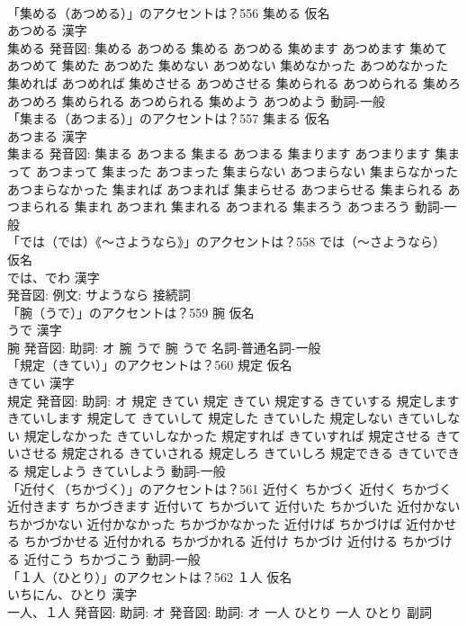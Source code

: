\documentclass[8pt]{extreport}
\begin{document}
\begin{CJK}{UTF8}{min}
\\	「集める（あつめる）」のアクセントは？556	集める 仮名　
\\	あつめる 漢字　
\\	集める 発音図:	集める あつめる		集める あつめる 集めます あつめます 集めて あつめて 集めた あつめた 集めない あつめない 集めなかった あつめなかった 集めれば あつめれば 集めさせる あつめさせる 集められる あつめられる 集めろ あつめろ 集められる あつめられる 集めよう あつめよう				動詞-一般 
\\	「集まる（あつまる）」のアクセントは？557	集まる 仮名　
\\	あつまる 漢字　
\\	集まる 発音図:	集まる あつまる		集まる あつまる 集まります あつまります 集まって あつまって 集まった あつまった 集まらない あつまらない 集まらなかった あつまらなかった 集まれば あつまれば 集まらせる あつまらせる 集まられる あつまられる 集まれ あつまれ 集まれる あつまれる 集まろう あつまろう				動詞-一般 
\\	「では（では）《〜さようなら》」のアクセントは？558	では（〜さようなら） 仮名　
\\	では、でわ 漢字　
\\	発音図: 例文: サようなら							接続詞 
\\	「腕（うで）」のアクセントは？559	腕 仮名　
\\	うで 漢字　
\\	腕 発音図: 助詞: オ	腕 うで		腕 うで				名詞-普通名詞-一般 
\\	「規定（きてい）」のアクセントは？560	規定 仮名　
\\	きてい 漢字　
\\	規定 発音図: 助詞: オ	規定 きてい		規定 きてい 規定する きていする 規定します きていします 規定して きていして 規定した きていした 規定しない きていしない 規定しなかった きていしなかった 規定すれば きていすれば 規定させる きていさせる 規定される きていされる 規定しろ きていしろ 規定できる きていできる 規定しよう きていしよう				動詞-一般 
\\	「近付く（ちかづく）」のアクセントは？561		近付く ちかづく		近付く ちかづく 近付きます ちかづきます 近付いて ちかづいて 近付いた ちかづいた 近付かない ちかづかない 近付かなかった ちかづかなかった 近付けば ちかづけば 近付かせる ちかづかせる 近付かれる ちかづかれる 近付け ちかづけ 近付ける ちかづける 近付こう ちかづこう				動詞-一般 
\\	「１人（ひとり）」のアクセントは？562	１人 仮名　
\\	いちにん、ひとり 漢字　
\\	一人、１人 発音図: 助詞: オ 発音図: 助詞: オ	一人 ひとり		一人 ひとり				副詞 

\end{CJK}
\end{document}
